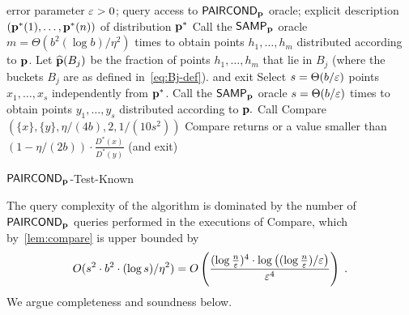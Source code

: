 \begin{algorithm}
\begin{algorithmic}[1]
\Require error parameter $\varepsilon > 0$; query access to ${\sf PAIRCOND}_{\mathbf{p}}$ oracle;
explicit description $(\mathbf{p}^\ast(1),\dots,\mathbf{p}^\ast(n))$ of distribution $\mathbf{p}^\ast$
\State \label{st:init-sample}
Call the ${\sf SAMP}_{\mathbf{p}}$ oracle $m = \Theta(b^2 (\log b)/\eta^2)$
times to obtain points $h_1,\dots,h_{m}$ distributed according
to $\mathbf{p}$.
\State \label{st:est-hatDBj}Let
${\widehat{\mathbf{p}}}(B_j)$ be the fraction of points $h_1,\dots,
h_m$ that lie in $B_j$ (where the buckets $B_j$ are as defined in~\cref{eq:Bj-def}).
\State \label{st:rej1} {\Return \reject and exit}
\EndIf
\EndFor
\State \label{st:Dstarsamp}
Select $s=\Theta(b/\varepsilon)$ points $x_1,\dots,x_s$ independently from $\mathbf{p}^\ast$.
\State \label{st:Dsamp}Call the ${\sf SAMP}_{\mathbf{p}}$ oracle $s=\Theta(b/\varepsilon)$ times to obtain points $y_1,\dots,y_s$
distributed according to $\mathbf{p}.$
 \label{st:loop}
\State \label{st:many}
{ Call {\sc Compare}$(\{x\},\{y\},\eta/(4b),2,1/(10s^2))$}
\If
{{ {\sc Compare} returns \low or a value smaller than
$(1-\eta/(2b))\cdot \frac{D^\ast(x)}{D^\ast(y)}$}}
\label{st:checkfreq}
\State \Return \reject (and exit) \label{st:r2}
\EndIf
\EndFor
\State \Return \accept
\end{algorithmic}\caption{\label{algo:pcond-test-known}\sc ${\sf PAIRCOND}_{\mathbf{p}}$-Test-Known}
\end{algorithm}

The query complexity of the algorithm is dominated by the number of ${\sf PAIRCOND}_{\mathbf{p}}$ queries performed in the executions of {\sc Compare},
which by~\cref{lem:compare} is upper bounded by
\[
{O}(s^2 \cdot b^2 \cdot (\log s) / \eta^2) = {O}\left({\frac {(\log {\frac{n}{\ensuremath{\varepsilon}}})^4 \cdot \log \left( (\log {\frac{n}{\ensuremath{\varepsilon}}})/\varepsilon\right)}
{\varepsilon^4}}
\right)\;.
\]
We argue completeness and soundness below.

\medskip

